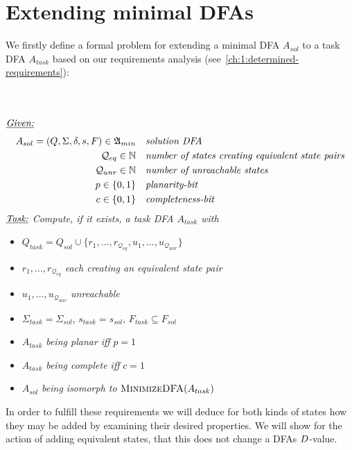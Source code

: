 
\chapter{Extending minimal DFAs} \label{ch:3}

We firstly define a formal problem for extending a minimal DFA $A_{sol}$ to a task DFA $A_{task}$ based on our requirements analysis (see~\ref{ch:1:determined-requirements}):
\begin{definition}[ExtendMinimalDFA] $ $ \\
	$ $ \vspace{-0.cm} \\
	\noindent $\underline{\emph{Given:}}$
	\vspace{-0.2cm}
	\begin{align*}
	A_{sol} = (Q, \Sigma, \delta, s, F) \in \mathfrak{A}_{min}\ \ \ & \emph{solution DFA} \\
	\mathcal{Q}_{eq} \in \mathbb{N}\ \ \ & \emph{number of states creating equivalent state pairs} \\
	\mathcal{Q}_{unr} \in \mathbb{N}\ \ \ & \emph{number of unreachable states} \\
	p \in \{0,1\}\ \ \ & \emph{planarity-bit} \\
	c \in \{0,1\}\ \ \ & \emph{completeness-bit}
	\end{align*}
	\noindent $\underline{\emph{Task:}}$ \emph{Compute, if it exists, a task DFA $A_{task}$ with}
	\begin{itemize}
		\item $Q_{task} = Q_{sol} \cup \{ r_1, \ldots, r_{\mathcal{Q}_{eq}}, u_1, \ldots, u_{\mathcal{Q}_{unr}} \}$
		\item $r_1, \ldots, r_{\mathcal{Q}_{eq}}$ \emph{each creating an equivalent state pair}
		\item $u_1, \ldots, u_{\mathcal{Q}_{unr}}$ \emph{unreachable}
		\item $\Sigma_{task} = \Sigma_{sol}$, $s_{task} = s_{sol}$, $F_{task} \subseteq F_{sol}$
		\item $A_{task}$ \emph{being planar iff} $p = 1$
		\item $A_{task}$ \emph{being complete iff} $c = 1$
		\item $A_{sol}$ \emph{being isomorph to} $\textsc{MinimizeDFA}(A_{task})$
	\end{itemize}
\end{definition}
\noindent In order to fulfill these requirements we will deduce for both kinds of states how they may be added by examining their desired properties. We will show for the action of adding equivalent states, that this does not change a DFAs $D$-value.

